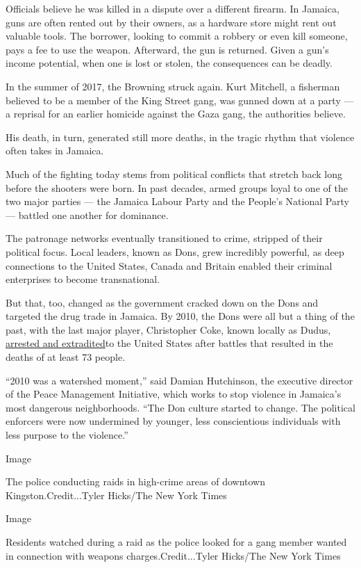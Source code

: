 Officials believe he was killed in a dispute over a different firearm.
In Jamaica, guns are often rented out by their owners, as a hardware
store might rent out valuable tools. The borrower, looking to commit a
robbery or even kill someone, pays a fee to use the weapon. Afterward,
the gun is returned. Given a gun's income potential, when one is lost or
stolen, the consequences can be deadly.

In the summer of 2017, the Browning struck again. Kurt Mitchell, a
fisherman believed to be a member of the King Street gang, was gunned
down at a party --- a reprisal for an earlier homicide against the Gaza
gang, the authorities believe.

His death, in turn, generated still more deaths, in the tragic rhythm
that violence often takes in Jamaica.

Much of the fighting today stems from political conflicts that stretch
back long before the shooters were born. In past decades, armed groups
loyal to one of the two major parties --- the Jamaica Labour Party and
the People's National Party --- battled one another for dominance.

The patronage networks eventually transitioned to crime, stripped of
their political focus. Local leaders, known as Dons, grew incredibly
powerful, as deep connections to the United States, Canada and Britain
enabled their criminal enterprises to become transnational.

But that, too, changed as the government cracked down on the Dons and
targeted the drug trade in Jamaica. By 2010, the Dons were all but a
thing of the past, with the last major player, Christopher Coke, known
locally as Dudus,
\href{https://www.nytimes3xbfgragh.onion/2010/06/26/world/americas/26coke.html}{arrested
and extradited}to the United States after battles that resulted in the
deaths of at least 73 people.

``2010 was a watershed moment,'' said Damian Hutchinson, the executive
director of the Peace Management Initiative, which works to stop
violence in Jamaica's most dangerous neighborhoods. ``The Don culture
started to change. The political enforcers were now undermined by
younger, less conscientious individuals with less purpose to the
violence.''

Image

The police conducting raids in high-crime areas of downtown
Kingston.Credit...Tyler Hicks/The New York Times

Image

Residents watched during a raid as the police looked for a gang member
wanted in connection with weapons charges.Credit...Tyler Hicks/The New
York Times

